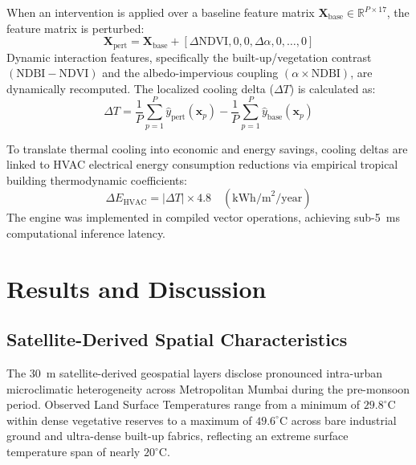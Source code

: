 \documentclass[a4paper,fleqn]{cas-sc}
\begin{document}
When an intervention is applied over a baseline feature matrix $\mathbf{X}_{\text{base}} \in \mathbb{R}^{P \times 17}$, the feature matrix is perturbed:
\begin{equation}
    \mathbf{X}_{\text{pert}} = \mathbf{X}_{\text{base}} + [\Delta\text{NDVI}, 0, 0, \Delta\alpha, 0, \dots, 0]
    \label{eq:pert}
\end{equation}
Dynamic interaction features, specifically the built-up/vegetation contrast $(\text{NDBI} - \text{NDVI})$ and the albedo-impervious coupling $(\alpha \times \text{NDBI})$, are dynamically recomputed. The localized cooling delta ($\Delta T$) is calculated as:
\begin{equation}
    \Delta T = \frac{1}{P} \sum_{p=1}^P \hat{y}_{\text{pert}}(\mathbf{x}_p) - \frac{1}{P} \sum_{p=1}^P \hat{y}_{\text{base}}(\mathbf{x}_p)
    \label{eq:delta_t}
\end{equation}

To translate thermal cooling into economic and energy savings, cooling deltas are linked to HVAC electrical energy consumption reductions via empirical tropical building thermodynamic coefficients:
\begin{equation}
    \Delta E_{\text{HVAC}} = |\Delta T| \times 4.8 \quad (\text{kWh/m}^2/\text{year})
    \label{eq:energy_hvac}
\end{equation}
The engine was implemented in compiled vector operations, achieving sub-5~ms computational inference latency.

\section{Results and Discussion}
\label{sec:results_discussion}

\subsection{Satellite-Derived Spatial Characteristics}
\label{subsec:spatial_results}

The 30~m satellite-derived geospatial layers disclose pronounced intra-urban microclimatic heterogeneity across Metropolitan Mumbai during the pre-monsoon period. Observed Land Surface Temperatures range from a minimum of $29.8^\circ\text{C}$ within dense vegetative reserves to a maximum of $49.6^\circ\text{C}$ across bare industrial ground and ultra-dense built-up fabrics, reflecting an extreme surface temperature span of nearly $20^\circ\text{C}$.
\end{document}
